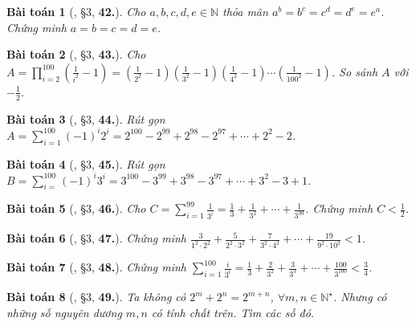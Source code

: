 \documentclass{article}
\numberwithin{equation}{section}
\newtheorem{baitoan}{Bài toán}[section]
\begin{document}
\begin{baitoan}[\cite{Binh_Toan_7_tap_1}, \S3, \textbf{42.}]
	Cho $a,b,c,d,e\in\mathbb{N}$ thỏa mãn $a^b = b^c = c^d = d^e = e^a$. Chứng minh $a = b = c = d = e$.
\end{baitoan}

\begin{baitoan}[\cite{Binh_Toan_7_tap_1}, \S3, \textbf{43.}]
	Cho $A = \prod_{i=2}^{100} \left(\frac{1}{i^2} - 1\right) = \left(\frac{1}{2^2} - 1\right)\left(\frac{1}{3^2} - 1\right)\left(\frac{1}{4^2} - 1\right)\cdots\left(\frac{1}{100^2} - 1\right)$. So sánh $A$ với $-\frac{1}{2}$.
\end{baitoan}

\begin{baitoan}[\cite{Binh_Toan_7_tap_1}, \S3, \textbf{44.}]
	Rút gọn $A = \sum_{i=1}^{100} (-1)^i2^i = 2^{100} - 2^{99} + 2^{98} - 2^{97} + \cdots + 2^2 - 2$.
\end{baitoan}

\begin{baitoan}[\cite{Binh_Toan_7_tap_1}, \S3, \textbf{45.}]
	Rút gọn $B = \sum_{i=
	}^{100} (-1)^i3^i = 3^{100} - 3^{99} + 3^{98} - 3^{97} + \cdots + 3^2 - 3 + 1$.
\end{baitoan}

\begin{baitoan}[\cite{Binh_Toan_7_tap_1}, \S3, \textbf{46.}]
	Cho $C = \sum_{i=1}^{99} \frac{1}{3^i} = \frac{1}{3} + \frac{1}{3^2} + \cdots + \frac{1}{3^{99}}$. Chứng minh $C < \frac{1}{2}$.
\end{baitoan}

\begin{baitoan}[\cite{Binh_Toan_7_tap_1}, \S3, \textbf{47.}]
	Chứng minh $\frac{3}{1^2\cdot 2^2} + \frac{5}{2^2\cdot 3^2} + \frac{7}{3^2\cdot 4^2} + \cdots + \frac{19}{9^2\cdot 10^2} < 1$.
\end{baitoan}

\begin{baitoan}[\cite{Binh_Toan_7_tap_1}, \S3, \textbf{48.}]
	Chứng minh $\sum_{i=1}^{100} \frac{i}{3^i} = \frac{1}{3} + \frac{2}{3^2} + \frac{3}{3^3} + \cdots + \frac{100}{3^{100}} < \frac{3}{4}$.
\end{baitoan}

\begin{baitoan}[\cite{Binh_Toan_7_tap_1}, \S3, \textbf{49.}]
	Ta không có $2^m + 2^n = 2^{m+n}$, $\forall m,n\in\mathbb{N}^\star$. Nhưng có những số nguyên dương $m,n$ có tính chất trên. Tìm các số đó.
\end{baitoan}
\end{document}
